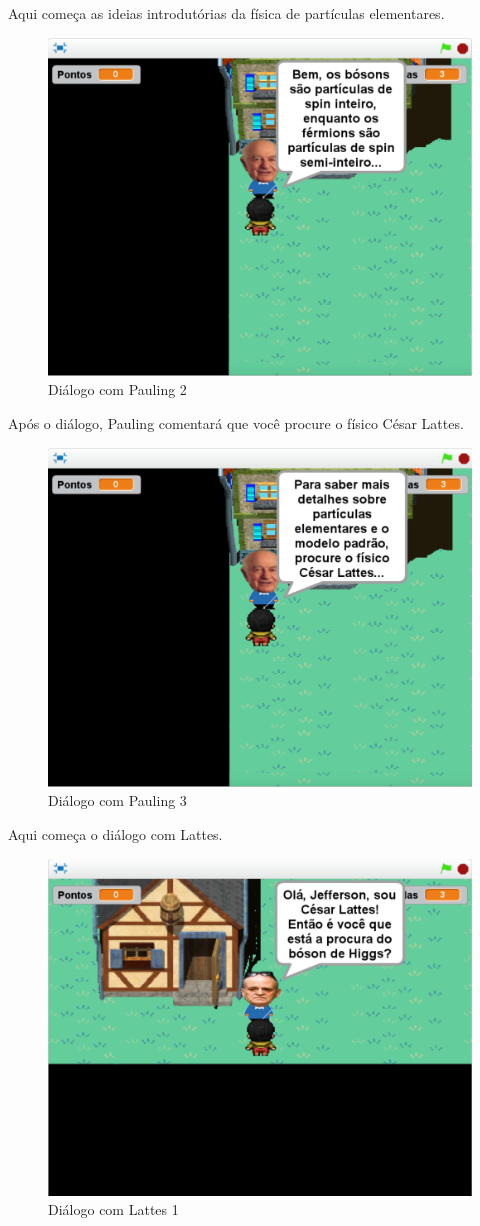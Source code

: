 \documentclass[12pt,fleqn]{book} %
\begin{document}
Aqui começa as ideias introdutórias da física de partículas elementares.

\begin{figure}[h]
	\centering
	\includegraphics[width=0.65 \textwidth]{Produto/jogo_7}
	\caption{Diálogo com Pauling 2}
	\label{fig:app_a:jogo7}
\end{figure}

\newpage

Após o diálogo, Pauling comentará que você procure o físico César Lattes.

\begin{figure}[h]
	\centering
	\includegraphics[width=0.65 \textwidth]{Produto/jogo_8}
	\caption{Diálogo com Pauling 3}
	\label{fig:app_a:jogo8}
\end{figure}

Aqui começa o diálogo com Lattes.

\begin{figure}[h]
	\centering
	\includegraphics[width=0.65 \textwidth]{Produto/jogo_9}
	\caption{Diálogo com Lattes 1}
	\label{fig:app_a:jogo9}
\end{figure}
\end{document}
